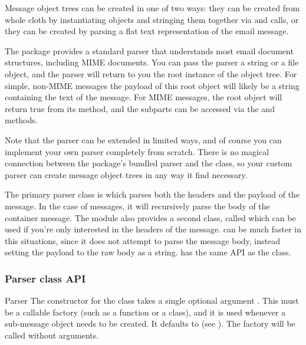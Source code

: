 
Message object trees can be created in one of two ways: they can be
created from whole cloth by instantiating  objects and
stringing them together via  and
 calls, or they can be created by parsing a flat text
representation of the email message.

The  package provides a standard parser that understands
most email document structures, including MIME documents.  You can
pass the parser a string or a file object, and the parser will return
to you the root  instance of the object tree.  For
simple, non-MIME messages the payload of this root object will likely
be a string containing the text of the message.  For MIME
messages, the root object will return true from its
 method, and the subparts can be accessed via
the  and  methods.

Note that the parser can be extended in limited ways, and of course
you can implement your own parser completely from scratch.  There is
no magical connection between the  package's bundled
parser and the  class, so your custom parser can create
message object trees in any way it find necessary.

The primary parser class is  which parses both the
headers and the payload of the message.  In the case of
 messages, it will recursively parse the body of
the container message.  The  module also provides
a second class, called  which can be used if
you're only interested in the headers of the message.
 can be much faster in this situations, since it
does not attempt to parse the message body, instead setting the
payload to the raw body as a string.   has the
same API as the  class.

\subsubsection{Parser class API}

\begin{classdesc}{Parser}{}
The constructor for the  class takes a single optional
argument .  This must be a callable factory (such as a
function or a class), and it is used whenever a sub-message object
needs to be created.  It defaults to  (see
).  The factory will be called without
arguments.
\end{classdesc}

